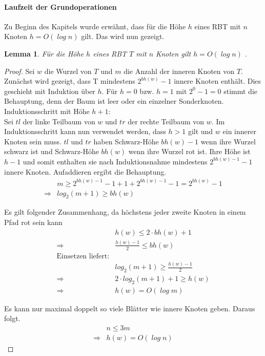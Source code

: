 \documentclass[a4paper,12pt]{article}
\begin{document}
\paragraph{Laufzeit der Grundoperationen}
Zu Beginn des Kapitels wurde erwähnt, dass für die Höhe $h$ eines RBT mit $n$ Knoten $h = \mathit{O(\log {n})}$  gilt. Das wird nun gezeigt. 
\newtheorem{Lemma}{Lemma}[section]
\begin{Lemma} Für die Höhe $h$ eines RBT $T$ mit $n$ Knoten gilt $h = \mathit{O(\log {n})}$ . 
\end{Lemma}
\begin{proof}
	Sei $w$ die Wurzel von $T$ und $m$ die Anzahl der inneren Knoten von $T$. 
	Zunächst wird gezeigt, dass T mindestens $2^\mathit{bh(w)} - 1$ innere Knoten enthält.
	Dies geschieht mit Induktion über $h$. Für $h = 0$ bzw.  $h = 1$ mit $2^0 - 1 = 0 $ stimmt die Behauptung, denn der Baum ist leer oder ein einzelner Sonderknoten.  
    Induktionsschritt mit Höhe $h + 1$:\\
    Sei $\mathit{tl}$ der linke Teilbaum von $w$ und $\mathit{tr}$ der rechte Teilbaum von $w$.  
    Im Induktionsschritt kann nun verwendet werden, dass $h > 1$ gilt und $w$ ein innerer Knoten sein muss. $\mathit{tl}$ und $\mathit{tr}$ haben Schwarz-Höhe $\mathit{bh(w)} - 1$ wenn ihre Wurzel schwarz ist und Schwarz-Höhe $\mathit{bh(w)}$ wenn ihre Wurzel rot ist. Ihre Höhe ist $h-1$ und somit enthalten sie nach Induktionsnahme mindestens  $2^\mathit{bh(w)- 1} - 1$ innere Knoten. Aufaddieren ergibt die Behauptung.\\    
    \begin{align*}
    &m \geq 2^\mathit{bh(w)- 1} - 1  + 1  + 2^\mathit{bh(w)- 1} - 1 = 2^\mathit{bh(w)} - 1\\
     \Rightarrow  &log_2(m + 1) \geq\mathit{bh(w)} 
    \end{align*}
  
    \noindent Es gilt folgender Zusammenhang, da höchstens jeder zweite Knoten in einem Pfad rot sein kann\\
    \begin{align*}
    &\mathit{h(w)} \leq 2 \cdot \mathit{bh(w) } + 1 \\
    \Rightarrow &\frac{\mathit{h(w)} - 1}{2} \leq\mathit{bh(w) } \\
  	\text{Einsetzen liefert:}\\
	&log_2(m + 1) \geq\frac{\mathit{h(w)} - 1}{2} \\
	\Rightarrow	&2 \cdot log_2(m + 1) + 1 \geq\mathit{h(w)} \\
    \Rightarrow &\mathit{h(w)} = \mathit{O(\log {m})} 
    \end{align*}
    

    
     \noindent Es kann nur maximal doppelt so viele Blätter wie innere Knoten geben. Daraus folgt.
   \begin{align*}
   &n  \leq 3 m \\
    \Rightarrow &\mathit{h(w)} = \mathit{O(\log {n})} 
   \end{align*} 
  
   
\end{proof}
\end{document}
